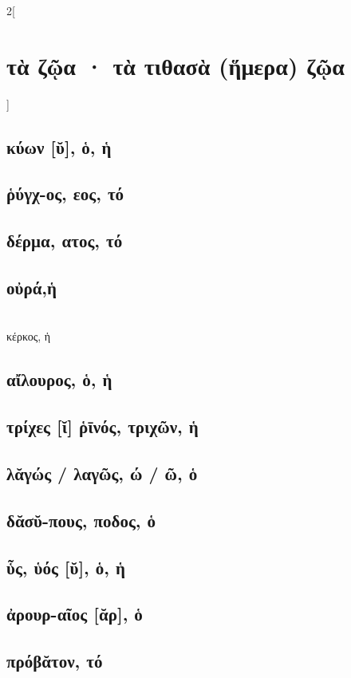 \documentclass{book}
\begin{document}
\begin{multicols}{2}[\section{τὰ ζῷα · τὰ τιθασὰ (ἥμερα) ζῷα}]
\subsection{κύων [ῠ], ὁ, ἡ}
\subsection{ῥύγχ-ος, εος, τό}
\subsection{δέρμα, ατος, τό}
\subsection{οὐρά,ἡ}
 ~\\
κέρκος, ἡ
\subsection{αἴλουρος, ὁ, ἡ}
\subsection{τρίχες [ῐ] ῥῑνός, τριχῶν, ἡ}
\subsection{λᾰγώς / λαγῶς, ώ / ῶ, ὁ}
\subsection{δᾰσῠ-πους, ποδος, ὁ}
\subsection{ὗς, ὑός [ῠ], ὁ, ἡ}
\subsection{ἀρουρ-αῖος [ᾰρ], ὁ}
\subsection{πρόβᾰτον, τό}

\end{multicols}
\end{document}
